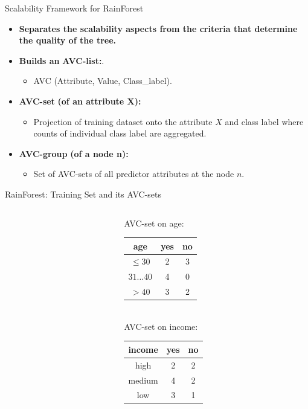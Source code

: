 \begin{frame}{Scalability Framework for RainForest}
	\begin{itemize}
		\item \textbf{Separates the scalability aspects from the criteria that determine the quality of the tree.}
		\item \textbf{Builds an} \textbf{\color{airforceblue}AVC-list:}.
		      \begin{itemize}
			      \item AVC (Attribute, Value, Class\_label).
		      \end{itemize}
		\item \textbf{\color{airforceblue}AVC-set} \textbf{(of an attribute X):}
		      \begin{itemize}
			      \item Projection of training dataset onto the attribute $X$ and class label where counts of individual class label are aggregated.
		      \end{itemize}
		\item \textbf{\color{airforceblue}AVC-group} \textbf{(of a node n):}
		      \begin{itemize}
			      \item Set of AVC-sets of all predictor attributes at the node $n$.
		      \end{itemize}
	\end{itemize}
\end{frame}

\begin{frame}{RainForest: Training Set and its AVC-sets}
	\begin{columns}
		\begin{column}{0.6\textwidth}
			\small
			
		\end{column}
		\begin{column}{0.3\textwidth}
			\vspace{-3cm}

			\centering
			AVC-set on age:\\
			\begin{tabular}{|c|c|c|}
				\hline
				age          & yes & no \\\hline
				$\leq 30$    & 2   & 3  \\\hline
				$31\ldots40$ & 4   & 0  \\\hline
				$>40$        & 3   & 2  \\\hline
			\end{tabular}\\[1cm]
			AVC-set on income:\\
			\begin{tabular}{|c|c|c|}
				\hline
				income & yes & no \\\hline
				high   & 2   & 2  \\\hline
				medium & 4   & 2  \\\hline
				low    & 3   & 1  \\\hline
			\end{tabular}
		\end{column}
	\end{columns}
\end{frame}


